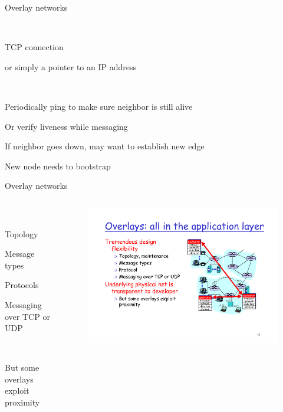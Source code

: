 \begin{frame}{Overlay networks}

\\
\BI
\item TCP connection
\item or simply a pointer to an IP address
\EI

\bigskip
{}\\
\BI
\item Periodically ping to make sure neighbor is still alive
\item Or verify liveness while messaging 
\item If neighbor goes down, may want to
establish new edge 
\item New node needs to bootstrap
\EI

\end{frame}


\begin{frame}{Overlay networks}

\begin{columns}
\begin{column}{0.4\textwidth}
\\
\BI
\item Topology
\item Message types
\item Protocols
\item Messaging over TCP or UDP
\EI

\bigskip
{}\\
\BI
\item But some overlays exploit proximity
\EI
\end{column}
\begin{column}{0.5\textwidth}
	\begin{figure}
		\includegraphics[width=1.0\textwidth]{overlay2.pdf}
	\end{figure}
\end{column}
\end{columns}

\end{frame}

